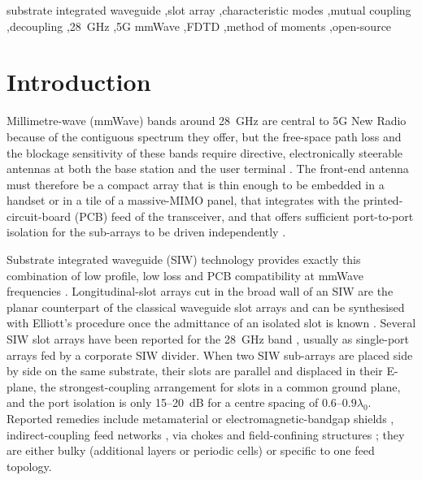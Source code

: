 \documentclass[preprint,12pt]{elsarticle}
\begin{document}
\begin{frontmatter}
\begin{keyword}
substrate integrated waveguide \sep slot array \sep characteristic modes \sep mutual coupling \sep decoupling \sep 28~GHz \sep 5G mmWave \sep FDTD \sep method of moments \sep open-source
\end{keyword}
\end{frontmatter}

\linenumbers

\section{Introduction}
Millimetre-wave (mmWave) bands around 28~GHz are central to 5G New Radio because of the contiguous spectrum they offer, but the free-space path loss and the blockage sensitivity of these bands require directive, electronically steerable antennas at both the base station and the user terminal \cite{rappaport2013,hong2017}. The front-end antenna must therefore be a compact array that is thin enough to be embedded in a handset or in a tile of a massive-MIMO panel, that integrates with the printed-circuit-board (PCB) feed of the transceiver, and that offers sufficient port-to-port isolation for the sub-arrays to be driven independently \cite{yang2017tsa,zhang2023wideband}.

Substrate integrated waveguide (SIW) technology provides exactly this combination of low profile, low loss and PCB compatibility at mmWave frequencies \cite{deslandes2006,xu2005,cassivi2002,coves2021}. Longitudinal-slot arrays cut in the broad wall of an SIW are the planar counterpart of the classical waveguide slot arrays and can be synthesised with Elliott's procedure once the admittance of an isolated slot is known \cite{elliott1983,elliott2003,yang2014,yang2015conformal,mallahzadeh2015}. Several SIW slot arrays have been reported for the 28~GHz band \cite{ashraf2015,lai2020,sun2020qmsiw,singh2021,kobal2022}, usually as single-port arrays fed by a corporate SIW divider. When two SIW sub-arrays are placed side by side on the same substrate, their slots are parallel and displaced in their E-plane, the strongest-coupling arrangement for slots in a common ground plane, and the port isolation is only 15--20~dB for a centre spacing of $0.6$--$0.9\lambda_0$. Reported remedies include metamaterial or electromagnetic-bandgap shields \cite{alibakhshikenari2019,dey2021}, indirect-coupling feed networks \cite{diman2021}, via chokes and field-confining structures \cite{zhang2023wideband}; they are either bulky (additional layers or periodic cells) or specific to one feed topology.
\end{document}
